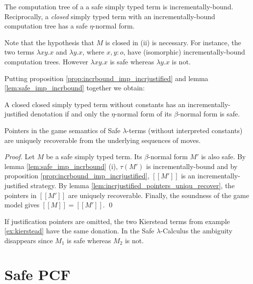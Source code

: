 \documentclass{llncs}
\newcommand{\sem}[1]{{[\![ #1 ]\!]}}
\newcommand\pcf{\textsf{PCF}}
\begin{document}
\begin{lemma}
\label{lem:safe_imp_incrbound}
The computation tree of a a safe simply typed term is incrementally-bound.
Reciprocally, a \emph{closed} simply typed term with an incrementally-bound computation tree has a safe $\eta$-normal form.
\end{lemma}

Note that the hypothesis that $M$ is closed in (ii) is necessary.
For instance, the two terms $\lambda x y .x$ and $\lambda y . x$,
where $x,y:o$, have (isomorphic) incrementally-bound computation
trees. However $\lambda x y .x$ is safe whereas $\lambda y . x$ is
not.



Putting proposition \ref{prop:incrbound_imp_incrjustified} and lemma
\ref{lem:safe_imp_incrbound} together we obtain:
\begin{corollary}
A closed closed simply typed term without constants has an
incrementally-justified denotation if and only the $\eta$-normal form of
its $\beta$-normal form is safe.
\end{corollary}

\begin{theorem}
\label{thm:safe_ptr_recoverable} Pointers in the game semantics of
Safe $\lambda$-terms (without interpreted constants) are uniquely recoverable from the underlying sequences of moves.
\end{theorem}
\begin{proof}
Let $M$ be a safe simply typed term. Its $\beta$-normal form $M'$
is also safe. By lemma \ref{lem:safe_imp_incrbound}
(i), $\tau(M')$ is incrementally-bound and by proposition
\ref{prop:incrbound_imp_incrjustified}, $\sem{M'}$ is an
incrementally-justified strategy. By lemma
\ref{lem:incrjustified_pointers_uniqu_recover}, the pointers in
$\sem{M'}$ are uniquely recoverable. Finally, the soundness of the
game model gives $\sem{M} = \sem{M'}$.
\qed
\end{proof}

\begin{example} If justification pointers are omitted, the two Kierstead terms from example \ref{ex:kierstead} have
the same donation. In the Safe $\lambda$-Calculus the ambiguity disappears since $M_1$ is safe whereas $M_2$ is not.
\end{example}


\section{Safe \pcf}
\end{document}
